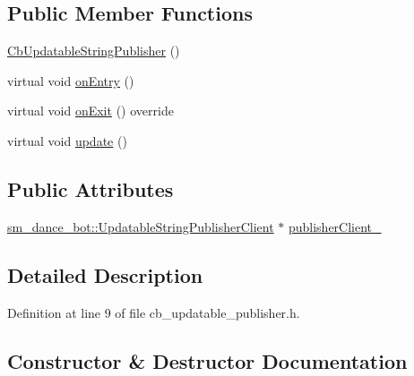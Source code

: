 \subsection*{Public Member Functions}
\begin{DoxyCompactItemize}
\item 
\hyperlink{classsm__dance__bot_1_1CbUpdatableStringPublisher_afa35b9261578b2497253a9275454426b}{Cb\+Updatable\+String\+Publisher} ()
\item 
virtual void \hyperlink{classsm__dance__bot_1_1CbUpdatableStringPublisher_a9167c33305953b7aed74bf7f35f1eae8}{on\+Entry} ()
\item 
virtual void \hyperlink{classsm__dance__bot_1_1CbUpdatableStringPublisher_a16af5659caeae65c4782a4fcf82ac05e}{on\+Exit} () override
\item 
virtual void \hyperlink{classsm__dance__bot_1_1CbUpdatableStringPublisher_a60984c937ed690724be1d2cc27cd24ea}{update} ()
\end{DoxyCompactItemize}
\subsection*{Public Attributes}
\begin{DoxyCompactItemize}
\item 
\hyperlink{classsm__dance__bot_1_1UpdatableStringPublisherClient}{sm\+\_\+dance\+\_\+bot\+::\+Updatable\+String\+Publisher\+Client} $\ast$ \hyperlink{classsm__dance__bot_1_1CbUpdatableStringPublisher_a4dbf2a2bd48ce6193617e5aba596caaf}{publisher\+Client\+\_\+}
\end{DoxyCompactItemize}


\subsection{Detailed Description}


Definition at line 9 of file cb\+\_\+updatable\+\_\+publisher.\+h.



\subsection{Constructor \& Destructor Documentation}
